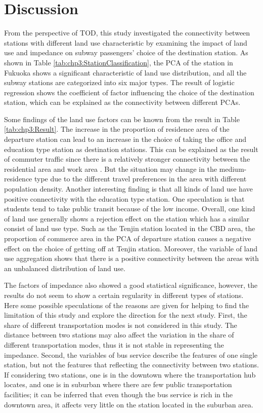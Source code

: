 \section{Discussion}
%
From the perspective of TOD, this study investigated the connectivity between stations with different land use characteristic by examining the impact of land use and impedance on subway passengers' choice of the destination station. As shown in Table \ref{tab:chp3:StationClassification}, the PCA of the station in Fukuoka shows a significant characteristic of land use distribution, and all the subway stations are categorized into six major types. The result of logistic regression shows the coefficient of factor influencing the choice of the destination station, which can be explained as the connectivity between different PCAs.

%
Some findings of the land use factors can be known from the result in Table \ref{tab:chp3:Result}. The increase in the proportion of residence area of the departure station can lead to an increase in the choice of taking the office and education type station as destination stations. This can be explained as the result of commuter traffic since there is a relatively stronger connectivity between the residential area and work area \cite{badoe2000transportation}. But the situation may change in the medium-residence type due to the different travel preferences in the area with different population density. Another interesting finding is that all kinds of land use have positive connectivity with the education type station. One speculation is that students tend to take public transit because of the low income. Overall, one kind of land use generally shows a rejection effect on the station which has a similar consist of land use type. Such as the Tenjin station located in the CBD area, the proportion of commerce area in the PCA of departure station causes a negative effect on the choice of getting off at Tenjin station. Moreover, the variable of land use aggregation shows that there is a positive connectivity between the areas with an unbalanced distribution of land use.

%
The factors of impedance also showed a good statistical significance, however, the results do not seem to show a certain regularity in different types of stations. Here some possible speculations of the reasons are given for helping to find the limitation of this study and explore the direction for the next study. First, the share of different transportation modes is not considered in this study. The distance between two stations may also affect the variation in the share of different transportation modes, thus it is not stable in representing the impedance.  Second, the variables of bus service describe the features of one single station, but not the features that reflecting the connectivity between two stations. If considering two stations, one is in the downtown where the transportation hub locates, and one is in suburban where there are few public transportation facilities; it can be inferred that even though the bus service is rich in the downtown area, it affects very little on the station located in the suburban area.

